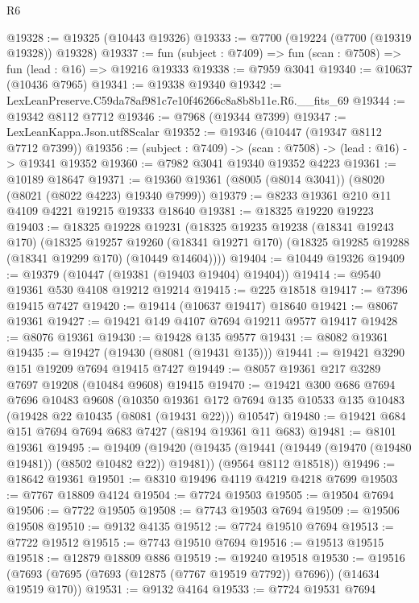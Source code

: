 \begin{lexlean}{R6}
\begin{coremodule}
@19328 := @19325 (@10443 @19326)
@19333 := @7700 (@19224 (@7700 (@19319 @19328)) @19328)
@19337 := fun (subject : @7409) => fun (scan : @7508) => fun (lead : @16) => @19216 @19333
@19338 := @7959 @3041
@19340 := @10637 (@10436 @7965)
@19341 := @19338 @19340
@19342 := LexLeanPreserve.C59da78af981c7e10f46266c8a8b8b11e.R6.__fits_69
@19344 := @19342 @8112 @7712
@19346 := @7968 (@19344 @7399)
@19347 := LexLeanKappa.Json.utf8Scalar
@19352 := @19346 (@10447 (@19347 @8112 @7712 @7399))
@19356 := (subject : @7409) -> (scan : @7508) -> (lead : @16) -> @19341 @19352
@19360 := @7982 @3041 @19340 @19352 @4223
@19361 := @10189 @18647
@19371 := @19360 @19361 (@8005 (@8014 @3041)) (@8020 (@8021 (@8022 @4223) @19340 @7999))
@19379 := @8233 @19361 @210 @11 @4109 @4221 @19215 @19333 @18640
@19381 := @18325 @19220 @19223
@19403 := @18325
    @19228
    @19231
    (@18325
      @19235
      @19238
      (@18341 @19243 @170)
      (@18325
        @19257
        @19260
        (@18341 @19271 @170)
        (@18325 @19285 @19288 (@18341 @19299 @170) (@10449 @14604))))
@19404 := @10449 @19326
@19409 := @19379 (@10447 (@19381 (@19403 @19404) @19404))
@19414 := @9540 @19361 @530 @4108 @19212 @19214
@19415 := @225 @18518
@19417 := @7396 @19415 @7427
@19420 := @19414 (@10637 @19417) @18640
@19421 := @8067 @19361
@19427 := @19421 @149 @4107 @7694 @19211 @9577 @19417
@19428 := @8076 @19361
@19430 := @19428 @135 @9577
@19431 := @8082 @19361
@19435 := @19427 (@19430 (@8081 (@19431 @135)))
@19441 := @19421 @3290 @151 @19209 @7694 @19415 @7427
@19449 := @8057 @19361 @217 @3289 @7697 @19208 (@10484 @9608) @19415
@19470 := @19421
    @300
    @686
    @7694
    @7696
    @10483
    @9608
    (@10350
      @19361
      @172
      @7694
      @135
      @10533
      @135
      @10483
      (@19428 @22 @10435 (@8081 (@19431 @22)))
      @10547)
@19480 := @19421 @684 @151 @7694 @7694 @683 @7427 (@8194 @19361 @11 @683)
@19481 := @8101 @19361
@19495 := @19409
    (@19420
      (@19435 (@19441 (@19449 (@19470 (@19480 @19481)) (@8502 @10482 @22)) @19481))
      (@9564 @8112 @18518))
@19496 := @18642 @19361
@19501 := @8310 @19496 @4119 @4219 @4218 @7699
@19503 := @7767 @18809 @4124
@19504 := @7724 @19503
@19505 := @19504 @7694
@19506 := @7722 @19505
@19508 := @7743 @19503 @7694
@19509 := @19506 @19508
@19510 := @9132 @4135
@19512 := @7724 @19510 @7694
@19513 := @7722 @19512
@19515 := @7743 @19510 @7694
@19516 := @19513 @19515
@19518 := @12879 @18809 @886
@19519 := @19240 @19518
@19530 := @19516 (@7693 (@7695 (@7693 (@12875 (@7767 @19519 @7792)) @7696)) (@14634 @19519 @170))
@19531 := @9132 @4164
@19533 := @7724 @19531 @7694

\end{coremodule}
\end{lexlean}
